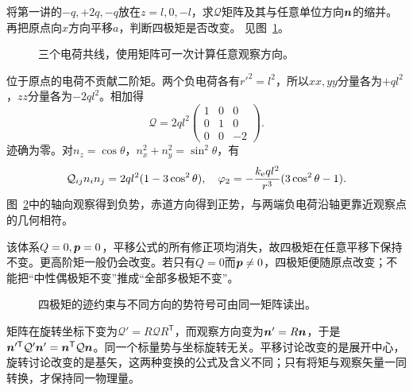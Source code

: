 \begin{example}[四极矩的矩阵]\label{ex:es2-e4}
将第一讲的$-q,+2q,-q$放在$z=l,0,-l$，求$\mathcal Q$矩阵及其与任意单位方向$\bm{n}$的缩并。再把原点向$x$方向平移$a$，判断四极矩是否改变。 见图~\ref{fig:es2-e4-q}。
\end{example}

\begin{figure}[H]\centering
{}
\caption{三个电荷共线，使用矩阵可一次计算任意观察方向。}\label{fig:es2-e4-q}
\end{figure}
\begin{solution}
位于原点的电荷不贡献二阶矩。两个负电荷各有$r'^2=l^2$，所以$xx,yy$分量各为$+ql^2$，$zz$分量各为$-2ql^2$。相加得
\[\mathcal Q=2ql^2\begin{pmatrix}1&0&0\\0&1&0\\0&0&-2\end{pmatrix}.
\]
迹确为零。对$n_z=\cos\theta$，$n_x^2+n_y^2=\sin^2\theta$，有
\[\mathcal Q_{ij}n_in_j=2ql^2(1-3\cos^2\theta),\quad
\varphi_2=-\frac{k_{\rm e} ql^2}{r^3}(3\cos^2\theta-1).
\]
图~\ref{fig:es2-e4-s}中的轴向观察得到负势，赤道方向得到正势，与两端负电荷沿轴更靠近观察点的几何相符。

该体系$Q=0,\bm{p}=0$，平移公式的所有修正项均消失，故四极矩在任意平移下保持不变。更高阶矩一般仍会改变。若只有$Q=0$而$\bm{p}\ne0$，四极矩便随原点改变；不能把“中性偶极矩不变”推成“全部多极矩不变”。
\begin{figure}[H]\centering
{}
\caption{四极矩的迹约束与不同方向的势符号可由同一矩阵读出。}\label{fig:es2-e4-s}
\end{figure}


矩阵在旋转坐标下变为$\mathcal Q'=R\mathcal QR^{\mathsf T}$，而观察方向变为$\bm{n}'=R\bm{n}$，于是$\bm{n}'^{\mathsf T}\mathcal Q'\bm{n}'=\bm{n}^{\mathsf T}\mathcal Q\bm{n}$。同一个标量势与坐标旋转无关。平移讨论改变的是展开中心，旋转讨论改变的是基矢，这两种变换的公式及含义不同；只有将矩与观察矢量一同转换，才保持同一物理量。
\end{solution}

